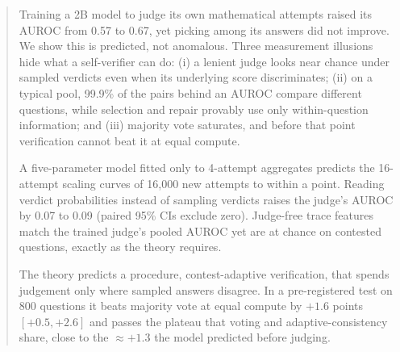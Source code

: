 \begin{abstract}
Training a 2B model to judge its own mathematical attempts raised its AUROC from 0.57 to 0.67, yet picking among its
answers did not improve. We show this is predicted, not anomalous. Three measurement illusions hide what a
self-verifier can do:
(i) a lenient judge looks near chance under sampled verdicts even when its underlying score discriminates;
(ii) on a typical pool, 99.9\% of the pairs behind an AUROC compare different questions, while selection and repair
provably use only within-question information; and
(iii) majority vote saturates, and before that point verification cannot beat it at equal compute.

A five-parameter model fitted only to 4-attempt aggregates predicts the 16-attempt scaling curves of 16,000 new
attempts to within a point. Reading verdict probabilities instead of sampling verdicts raises the judge's AUROC by 0.07
to 0.09 (paired 95\% CIs exclude zero). Judge-free trace features match the trained judge's pooled AUROC yet are at
chance on contested questions, exactly as the theory requires.

The theory predicts a procedure, contest-adaptive verification, that spends judgement only where sampled answers
disagree. In a pre-registered test on 800 questions it beats majority vote at equal compute by $+1.6$ points
$[+0.5, +2.6]$ and passes the plateau that voting and adaptive-consistency share, close to the $\approx+1.3$ the
model predicted before judging.
\end{abstract}
